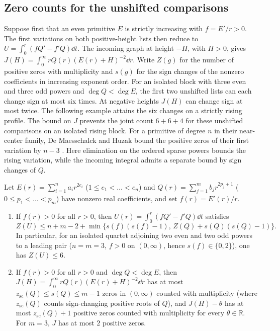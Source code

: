 \subsection{Zero counts for the unshifted comparisons}\label{subsec:obstruction-proof}
Suppose first that an even primitive $E$ is strictly increasing with
$f=E'/r>0$. The first variations on both positive-height lists then
reduce to $U=\int_0^r(fQ'-f'Q)\dd t$. The incoming graph at height $-H$, with $H>0$,
gives $J(H)=\int_0^\infty rQ(r)(E(r)+H)^{-2}\dd r$.
Write $Z(g)$ for the number of positive zeros with multiplicity and $s(g)$
for the sign changes of the nonzero coefficients in increasing exponent
order. For an isolated block with three even and three odd powers and
$\deg Q<\deg E$, the first two unshifted lists can each change sign at
most six times. At negative heights $J(H)$ can change sign at most
twice. The following example attains the six changes on a strictly rising profile.
The bound on $J$ prevents the joint count $6+6+4$ for these
unshifted comparisons on an isolated rising block. For a primitive of
degree $n$ in their near-center family, De Maesschalck and Huzak bound
the positive zeros of their first variation by $n-3$
\cite[Proposition~3 and Remark~2]{DMH}. Here elimination on the
ordered sparse powers bounds the rising variation, while the incoming
integral admits a separate bound by sign changes of $Q$.

\begin{proposition}\label{prop:monotone-obstruction}
Let $E(r)=\sum_{i=1}^n a_i r^{2e_i}$ ($1\le e_1<\dots<e_n$) and $Q(r)=\sum_{j=1}^m b_j r^{2p_j+1}$
($0\le p_1<\dots<p_m$) have nonzero real coefficients, and set $f(r)=E'(r)/r$.
\begin{enumerate}
  \item[\textup{(i)}] If $f(r)>0$ for all $r>0$, then $U(r)=\int_0^r(fQ'-f'Q)\dd t$ satisfies
  \begin{equation}\label{eq:wronskian-cap}
    Z(U) \le n + m - 2 + \min\bigl\{s(f)(s(f)-1),\, Z(Q)+s(Q)(s(Q)-1)\bigr\}.
  \end{equation}
  In particular, for an isolated quartet adjoining two even and two odd powers to a leading pair
  ($n=m=3$, $f>0$ on $(0,\infty)$, hence $s(f)\in\{0,2\}$), one has $Z(U)\le 6$.
  \item[\textup{(ii)}] If $f(r)>0$ for all $r>0$ and $\deg Q<\deg E$, then $J(H)=\int_0^\infty
  rQ(r)(E(r)+H)^{-2}\dd r$ has at most $z_{\mathrm{sc}}(Q)\le s(Q)\le m-1$ zeros in $(0,\infty)$
  counted with multiplicity (where $z_{\mathrm{sc}}(Q)$ counts sign-changing positive roots of $Q$),
  and $J(H)-\theta$ has at most $z_{\mathrm{sc}}(Q)+1$ positive zeros counted with multiplicity for
  every $\theta\in\mathbb{R}$. For $m=3$, $J$ has at most $2$ positive zeros.
\end{enumerate}
\end{proposition}

